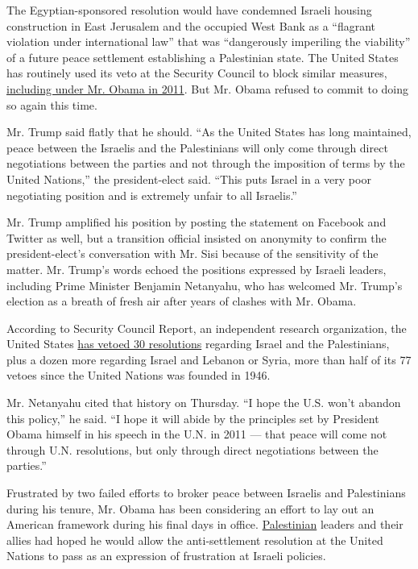 The Egyptian-sponsored resolution would have condemned Israeli housing
construction in East Jerusalem and the occupied West Bank as a
``flagrant violation under international law'' that was ``dangerously
imperiling the viability'' of a future peace settlement establishing a
Palestinian state. The United States has routinely used its veto at the
Security Council to block similar measures,
\href{http://www.nytimes3xbfgragh.onion/2011/02/19/world/middleeast/19nations.html}{including
under Mr. Obama in 2011}. But Mr. Obama refused to commit to doing so
again this time.

Mr. Trump said flatly that he should. ``As the United States has long
maintained, peace between the Israelis and the Palestinians will only
come through direct negotiations between the parties and not through the
imposition of terms by the United Nations,'' the president-elect said.
``This puts Israel in a very poor negotiating position and is extremely
unfair to all Israelis.''

Mr. Trump amplified his position by posting the statement on Facebook
and Twitter as well, but a transition official insisted on anonymity to
confirm the president-elect's conversation with Mr. Sisi because of the
sensitivity of the matter. Mr. Trump's words echoed the positions
expressed by Israeli leaders, including Prime Minister Benjamin
Netanyahu, who has welcomed Mr. Trump's election as a breath of fresh
air after years of clashes with Mr. Obama.

According to Security Council Report, an independent research
organization, the United States
\href{http://www.securitycouncilreport.org/atf/cf/\%7B65BFCF9B-6D27-4E9C-8CD3-CF6E4FF96FF9\%7D/SCR-veto-insert-2.pdf}{has
vetoed 30 resolutions} regarding Israel and the Palestinians, plus a
dozen more regarding Israel and Lebanon or Syria, more than half of its
77 vetoes since the United Nations was founded in 1946.

Mr. Netanyahu cited that history on Thursday. ``I hope the U.S. won't
abandon this policy,'' he said. ``I hope it will abide by the principles
set by President Obama himself in his speech in the U.N. in 2011 ---
that peace will come not through U.N. resolutions, but only through
direct negotiations between the parties.''

Frustrated by two failed efforts to broker peace between Israelis and
Palestinians during his tenure, Mr. Obama has been considering an effort
to lay out an American framework during his final days in office.
\href{http://topics.nytimes3xbfgragh.onion/top/reference/timestopics/subjects/p/palestinians/index.html?inline=nyt-classifier}{Palestinian}
leaders and their allies had hoped he would allow the anti-settlement
resolution at the United Nations to pass as an expression of frustration
at Israeli policies.

